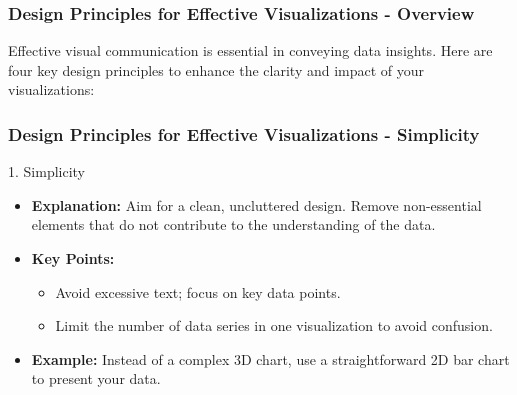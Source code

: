 \documentclass[aspectratio=169]{beamer}
\begin{document}
\begin{frame}[fragile]
    \frametitle{Design Principles for Effective Visualizations - Overview}
    Effective visual communication is essential in conveying data insights. Here are four key design principles to enhance the clarity and impact of your visualizations:
\end{frame}

\begin{frame}[fragile]
    \frametitle{Design Principles for Effective Visualizations - Simplicity}
    \begin{block}{1. Simplicity}
        \begin{itemize}
            \item \textbf{Explanation:} Aim for a clean, uncluttered design. Remove non-essential elements that do not contribute to the understanding of the data.
            \item \textbf{Key Points:}
                \begin{itemize}
                    \item Avoid excessive text; focus on key data points.
                    \item Limit the number of data series in one visualization to avoid confusion.
                \end{itemize}
            \item \textbf{Example:} Instead of a complex 3D chart, use a straightforward 2D bar chart to present your data.
        \end{itemize}
    \end{block}
\end{frame}
\end{document}
